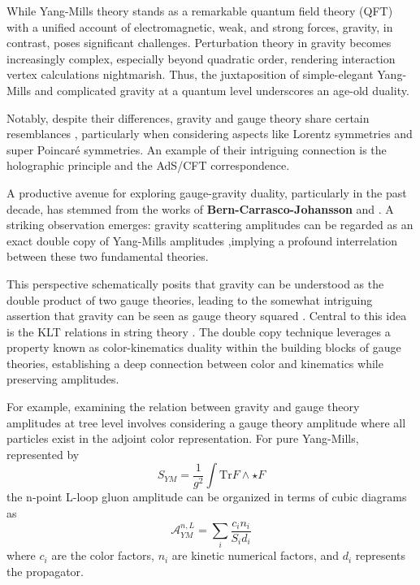 \documentclass[13pt]{article}
\begin{document}
While Yang-Mills theory stands as a remarkable quantum field theory (QFT) with a unified account of electromagnetic, weak, and strong forces, gravity, in contrast, poses significant challenges. Perturbation theory in gravity becomes increasingly complex, especially beyond quadratic order, rendering interaction vertex calculations nightmarish. Thus, the juxtaposition of simple-elegant Yang-Mills and complicated gravity at a quantum level underscores an age-old duality.

Notably, despite their differences, gravity and gauge theory share certain resemblances \cite{Bern2010b,borsten2020gravity}, particularly when considering aspects like Lorentz symmetries and super Poincaré symmetries. An example of their intriguing connection is the holographic principle and the AdS/CFT correspondence.

A productive avenue for exploring gauge-gravity duality, particularly in the past decade, has stemmed from the works of \textbf{Bern-Carrasco-Johansson} \cite{Bern2008,Bern2010b} and \cite{Bern2010}. A striking observation emerges: gravity scattering amplitudes can be regarded as an exact double copy of Yang-Mills amplitudes \cite{Oxburgh_2013,Bern2010b},implying a profound interrelation between these two fundamental theories.

This perspective schematically posits that gravity can be understood as the double product of two gauge theories, leading to the somewhat intriguing assertion that gravity can be seen as gauge theory squared \cite{Bern2010b,wood2021gravity}. Central to this idea is the KLT relations in string theory \cite{Bjerrum_Bohr_2004,ANANTH2007128}. The double copy technique leverages a property known as color-kinematics duality within the building blocks of gauge theories, establishing a deep connection between color and kinematics while preserving amplitudes.

For example, examining the relation between gravity and gauge theory amplitudes at tree level involves considering a gauge theory amplitude where all particles exist in the adjoint color representation. For pure Yang-Mills, represented by
\begin{equation}
S_{YM} = \frac{1}{g^2} \int \text{Tr} F \wedge \star F \tag{1}
\end{equation}
the n-point L-loop gluon amplitude can be organized in terms of cubic diagrams as
\begin{equation}
\mathcal{A}_{YM}^{n,L} = \sum_i \frac{c_i n_i}{S_i d_i} \tag{2}
\end{equation}
where $c_i$ are the color factors, $n_i$ are kinetic numerical factors, and $d_i$ represents the propagator.
\end{document}
